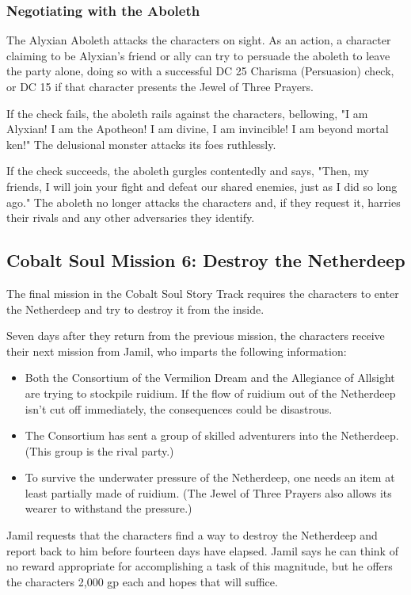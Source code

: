 \documentclass[10pt,a4paper,twoside,bg=print,twocolumn,openany,nodeprecatedcode]{dndbook}
\begin{document}
\subsubsection{Negotiating with the Aboleth}
The Alyxian Aboleth attacks the characters on sight. As an action, a character claiming to be Alyxian's friend or ally can try to persuade the aboleth to leave the party alone, doing so with a successful DC 25 Charisma (Persuasion) check, or DC 15 if that character presents the Jewel of Three Prayers.

If the check fails, the aboleth rails against the characters, bellowing, "I am Alyxian! I am the Apotheon! I am divine, I am invincible! I am beyond mortal ken!" The delusional monster attacks its foes ruthlessly.

If the check succeeds, the aboleth gurgles contentedly and says, "Then, my friends, I will join your fight and defeat our shared enemies, just as I did so long ago." The aboleth no longer attacks the characters and, if they request it, harries their rivals and any other adversaries they identify.

\subsection{Cobalt Soul Mission 6: Destroy the Netherdeep}
The final mission in the Cobalt Soul Story Track requires the characters to enter the Netherdeep and try to destroy it from the inside.

Seven days after they return from the previous mission, the characters receive their next mission from Jamil, who imparts the following information:


\begin{itemize}
\item Both the Consortium of the Vermilion Dream and the Allegiance of Allsight are trying to stockpile ruidium. If the flow of ruidium out of the Netherdeep isn't cut off immediately, the consequences could be disastrous.
\item The Consortium has sent a group of skilled adventurers into the Netherdeep. (This group is the rival party.)
\item To survive the underwater pressure of the Netherdeep, one needs an item at least partially made of ruidium. (The Jewel of Three Prayers also allows its wearer to withstand the pressure.)
\end{itemize}

Jamil requests that the characters find a way to destroy the Netherdeep and report back to him before fourteen days have elapsed. Jamil says he can think of no reward appropriate for accomplishing a task of this magnitude, but he offers the characters 2,000 gp each and hopes that will suffice.
\end{document}
